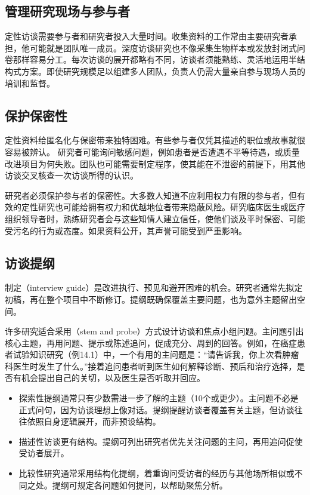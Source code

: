 \subsection{管理研究现场与参与者}
定性访谈需要参与者和研究者投入大量时间。收集资料的工作常由主要研究者承担，他可能就是团队唯一成员。深度访谈研究也不像采集生物样本或发放封闭式问卷那样容易分工。每次访谈的展开都略有不同，访谈者须能熟练、灵活地运用半结构式方案。即使研究规模足以组建多人团队，负责人仍需大量亲自参与现场人员的培训和监督。

\subsection{保护保密性}
定性资料给匿名化与保密带来独特困难。有些参与者仅凭其描述的职位或故事就很容易被辨认。
研究者可能询问敏感问题，例如患者是否遭遇不平等待遇，或质量改进项目为何失败。团队也可能需要制定程序，使其能在不泄密的前提下，用其他访谈交叉核查一次访谈所得的认识。

研究者必须保护参与者的保密性。大多数人知道不应利用权力有限的参与者，但有效的定性研究也可能给拥有权力和优越地位者带来隐蔽风险。研究临床医生或医疗组织领导者时，熟练研究者会与这些知情人建立信任，使他们谈及平时保密、可能受污名的行为或态度。如果资料公开，其声誉可能受到严重影响。

\subsection{访谈提纲}
制定（interview guide）是改进执行、预见和避开困难的机会。研究者通常先拟定初稿，再在整个项目中不断修订。提纲既确保覆盖主要问题，也为意外主题留出空间。

许多研究适合采用（stem and probe）方式设计访谈和焦点小组问题。主问题引出核心主题，再用问题、提示或陈述追问，促成充分、周到的回答。例如，在癌症患者试验知识研究（例14.1）中，一个有用的主问题是：“请告诉我，你上次看肿瘤科医生时发生了什么。”接着追问患者听到医生如何解释诊断、预后和治疗选择，是否有机会提出自己的关切，以及医生是否听取并回应。
\begin{itemize}
\item 探索性提纲通常只有少数需进一步了解的主题（10个或更少）。主问题不必是正式问句，因为访谈理想上像对话。提纲提醒访谈者覆盖有关主题，但访谈往往依照自身逻辑展开，而非预设结构。
\item 描述性访谈更有结构。提纲可列出研究者优先关注问题的主问，再用追问促使受访者展开。
\item 比较性研究通常采用结构化提纲，着重询问受访者的经历与其他场所相似或不同之处。提纲可规定各问题如何提问，以帮助聚焦分析。
\end{itemize}

